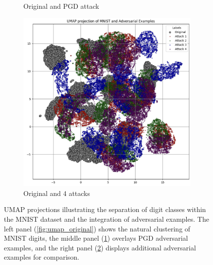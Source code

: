 \documentclass[10pt, conference, a4paper, final]{IEEEtran}
\begin{document}
\begin{figure}[!ht]
\begin{subfigure}{.34\textwidth}
        \caption{Original and PGD attack}
        \label{fig:umap_pgd}
    \end{subfigure}%
    \hfill
    \begin{subfigure}{.28\textwidth}
        \centering
        \includegraphics[width=\linewidth]{paper_images/UMAP_adversary.png}
        \caption{Original and 4 attacks}
        \label{fig:umap_additional_adv}
    \end{subfigure}
    \caption{UMAP projections illustrating the separation of digit classes within the MNIST dataset and the integration of adversarial examples. The left panel (\ref{fig:umap_original}) shows the natural clustering of MNIST digits, the middle panel (\ref{fig:umap_pgd}) overlays PGD adversarial examples, and the right panel (\ref{fig:umap_additional_adv}) displays additional adversarial examples for comparison.}
    \label{fig:umap}
\end{figure}
\end{document}
